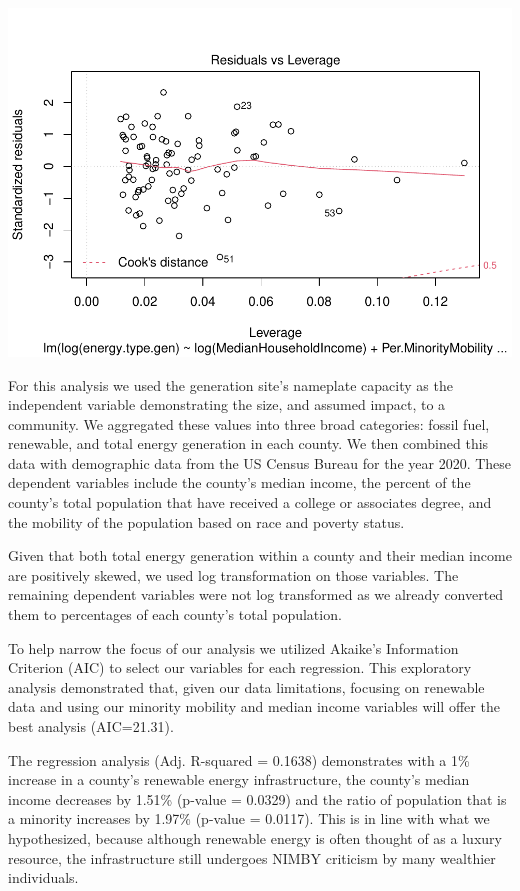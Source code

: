 \documentclass[
  12pt,
]{article}
\begin{document}
\includegraphics{Project_files/figure-latex/unnamed-chunk-6-4.pdf}

For this analysis we used the generation site's nameplate capacity as
the independent variable demonstrating the size, and assumed impact, to
a community. We aggregated these values into three broad categories:
fossil fuel, renewable, and total energy generation in each county. We
then combined this data with demographic data from the US Census Bureau
for the year 2020. These dependent variables include the county's median
income, the percent of the county's total population that have received
a college or associates degree, and the mobility of the population based
on race and poverty status.

Given that both total energy generation within a county and their median
income are positively skewed, we used log transformation on those
variables. The remaining dependent variables were not log transformed as
we already converted them to percentages of each county's total
population.

To help narrow the focus of our analysis we utilized Akaike's
Information Criterion (AIC) to select our variables for each regression.
This exploratory analysis demonstrated that, given our data limitations,
focusing on renewable data and using our minority mobility and median
income variables will offer the best analysis (AIC=21.31).

The regression analysis (Adj. R-squared = 0.1638) demonstrates with a
1\% increase in a county's renewable energy infrastructure, the county's
median income decreases by 1.51\% (p-value = 0.0329) and the ratio of
population that is a minority increases by 1.97\% (p-value = 0.0117).
This is in line with what we hypothesized, because although renewable
energy is often thought of as a luxury resource, the infrastructure
still undergoes NIMBY criticism by many wealthier individuals.
\end{document}
